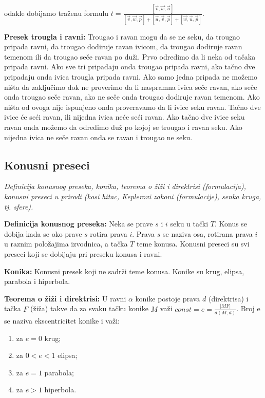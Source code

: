 \documentclass[12pt]{article}
\newcommand{\vek}[1]{\overrightarrow{#1}}
\begin{document}
odakle dobijamo traženu formulu
$t=\frac{[\vek{v},\vek{w},\vek{u}]}{[\vek{v},\vek{w},\vek{p}]+[\vek{u},\vek{v},\vek{p}]+[\vek{w},\vek{u},\vek{p}]}$.
\par

\textbf{Presek trougla i ravni:} Trougao i ravan mogu da se ne seku, da trougao
pripada ravni, da trougao dodiruje ravan ivicom, da trougao dodiruje ravan
temenom ili da trougao seče ravan po duži. Prvo odredimo da li neka od tačaka
pripada ravni. Ako sve tri pripadaju onda trougao pripada ravni, ako tačno
dve pripadaju onda ivica trougla pripada ravni. Ako samo jedna pripada ne
možemo ništa da zaključimo dok ne proverimo da li naspramna ivica seče ravan,
ako seče onda trougao seče ravan, ako ne seče onda trougao dodiruje ravan
temenom. Ako ništa od ovoga nije ispunjeno onda proveravamo da li ivice seku
ravan. Tačno dve ivice će seći ravan, ili nijedna ivica neće seći ravan. Ako
tačno dve ivice seku ravan onda možemo da odredimo duž po kojoj se trougao
i ravan seku. Ako nijedna ivica ne seče ravan onda se ravan i trougao ne seku.


\subsection{Konusni preseci}
\textit{Definicija konusnog preseka, konika, teorema o žiži i
    direktrisi (formulacija), konusni preseci u prirodi (kosi hitac, Keplerovi
    zakoni (formulacije), senka kruga, tj. sfere).}
\par
\vspace*{1cm}

\textbf{Definicija konusnog preseka:} Neka se prave $s$ i $i$ seku u tački $T$.
Konus se dobija kada se oko prave $s$ rotira prava $i$. Prava $s$ se naziva
osa, rotirana prava $i$ u raznim položajima izvodnica, a tačka $T$ teme konusa.
Konusni preseci su svi preseci koji se dobijaju pri preseku konusa i ravni.
\par

\textbf{Konika:} Konusni presek koji ne sadrži teme konusa. Konike su krug,
elipsa, parabola i hiperbola.
\par

\textbf{Teorema o žiži i direktrisi:} U ravni $\alpha$ konike postoje prava $d$
(direktrisa) i tačka $F$ (žiža) takve da za svaku tačku konike $M$ važi
$const=e=\frac{|MF|}{d(M,d)}$. Broj e se naziva ekscentricitet konike i važi:
\begin{enumerate}[label=\textbf{(\arabic*)}]
    \item za $e=0$ krug;
    \item za $0<e<1$ elipsa;
    \item za $e=1$ parabola;
    \item za $e>1$ hiperbola.
\end{enumerate}
\par
\end{document}

